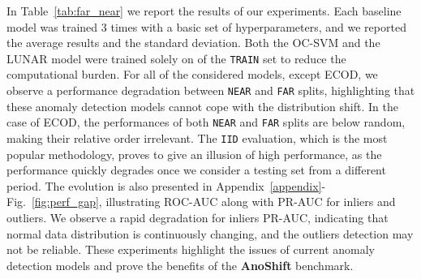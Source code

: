 \documentclass{article}
\begin{document}
    In Table~\ref{tab:far_near} we report the results of our experiments. Each baseline model was trained 3 times with a basic set of hyperparameters, and we reported the average results and the standard deviation. Both the OC-SVM and the LUNAR model were trained solely on  of the \texttt{TRAIN} set to reduce the computational burden. For all of the considered models, except ECOD, we observe a performance degradation between \texttt{NEAR} and \texttt{FAR} splits, highlighting that these anomaly detection models cannot cope with the distribution shift. In the case of ECOD, the performances of both \texttt{NEAR} and \texttt{FAR} splits are below random, making their relative order irrelevant. The \texttt{IID} evaluation, which is the most popular methodology, proves to give an illusion of high performance, as the performance quickly degrades once we consider a testing set from a different period. The evolution is also presented in Appendix~\ref{appendix}-Fig.~\ref{fig:perf_gap}, illustrating ROC-AUC along with PR-AUC for inliers and outliers. We observe a rapid degradation for inliers PR-AUC, indicating that normal data distribution is continuously changing, and the outliers detection may not be reliable. These experiments highlight the issues of current anomaly detection models and prove the benefits of the \textbf{AnoShift} benchmark. 
    
\end{document}
